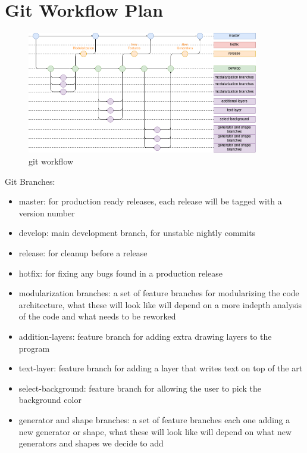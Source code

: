\documentclass{article}
\begin{document}
\section{Git Workflow Plan}

\begin{figure}[H]
    \centering
    \includegraphics[width=0.9\textwidth]{git-workflow.png}
    \caption{git workflow}
\end{figure}

Git Branches:

\begin{itemize}
    \item master: for production ready releases, each release will be tagged with a version number
    \item develop: main development branch, for unstable nightly commits
    \item release: for cleanup before a release
    \item hotfix: for fixing any bugs found in a production release
    \item modularization branches: a set of feature branches for modularizing the code architecture, what these will look like will depend on a more indepth analysis of the code and what needs to be reworked
    \item addition-layers: feature branch for adding extra drawing layers to the program
    \item text-layer: feature branch for adding a layer that writes text on top of the art
    \item select-background: feature branch for allowing the user to pick the background color
    \item generator and shape branches: a set of feature branches each one adding a new generator or shape, what these will look like will depend on what new generators and shapes we decide to add
\end{itemize}
\end{document}
